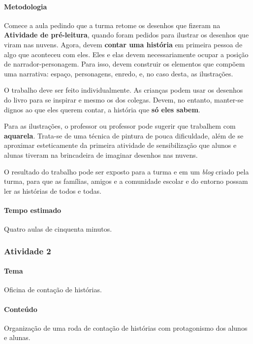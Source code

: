 \documentclass[11pt]{extarticle}
\begin{document}

\paragraph{Metodologia} Comece a aula pedindo que a turma retome os desenhos que fizeram
na \textbf{Atividade de pré-leitura}, quando foram pedidos para ilustrar os
desenhos que viram nas nuvens. 
Agora, devem \textbf{contar uma história} em primeira pessoa de algo que aconteceu com eles.  
Eles e elas devem necessariamente ocupar a posição de narrador-personagem.
Para isso, devem construir os elementos que compõem uma narrativa: espaço, personagens, enredo, e,
no caso desta, as ilustrações. 

O trabalho deve ser feito individualmente. As crianças podem usar os desenhos do livro
para se inspirar e mesmo os dos colegas. Devem, no entanto, manter-se dignos 
ao que eles querem contar, a história que \textbf{só eles sabem}. 

Para as ilustrações, o professor ou professor pode sugerir que trabalhem com \textbf{aquarela}.
Trata-se de uma técnica de pintura de pouca dificuldade, além de se aproximar esteticamente
da primeira atividade de sensibilização que alunos e alunas tiveram na brincadeira
de imaginar desenhos nas nuvens. 

O resultado do trabalho pode ser exposto para a turma e em um \textit{blog} criado
pela turma, para que as famílias, amigos e a comunidade escolar e do entorno possam 
ler as histórias de todos e todas. 

\paragraph{Tempo estimado} Quatro aulas de cinquenta minutos.


\subsubsection{Atividade 2}


\paragraph{Tema} Oficina de contação de histórias. 

\paragraph{Conteúdo} Organização de uma roda de contação de histórias
com protagonismo dos alunos e alunas.
\end{document}
